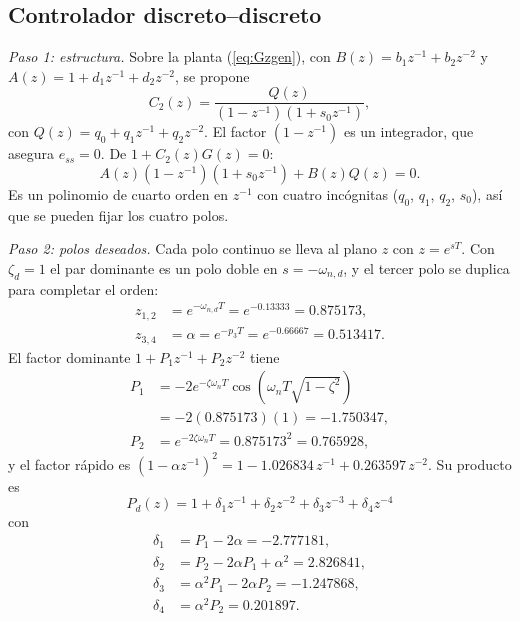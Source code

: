 \documentclass[conference]{IEEEtran}
\begin{document}
\subsection{Controlador discreto--discreto}
\textit{Paso 1: estructura.} Sobre la planta (\ref{eq:Gzgen}), con
$B(z) = b_1z^{-1} + b_2z^{-2}$ y $A(z) = 1 + d_1z^{-1} + d_2z^{-2}$, se
propone
\begin{equation}
  C_2(z) = \frac{Q(z)}{(1-z^{-1})(1+s_0z^{-1})},
  \label{eq:C2}
\end{equation}
con $Q(z) = q_0 + q_1z^{-1} + q_2z^{-2}$. El factor $(1-z^{-1})$ es un
integrador, que asegura $e_{ss} = 0$. De $1 + C_2(z)G(z) = 0$:
\begin{equation}
  A(z)(1-z^{-1})(1+s_0z^{-1}) + B(z)Q(z) = 0.
  \label{eq:carZ}
\end{equation}
Es un polinomio de cuarto orden en $z^{-1}$ con cuatro incógnitas
($q_0$, $q_1$, $q_2$, $s_0$), así que se pueden fijar los cuatro polos.

\textit{Paso 2: polos deseados.} Cada polo continuo se lleva al plano $z$ con
$z = e^{sT}$. Con $\zeta_d = 1$ el par dominante es un polo doble en
$s = -\omega_{n,d}$, y el tercer polo se duplica para completar el orden:
\begin{align*}
  z_{1,2} &= e^{-\omega_{n,d}T} = e^{-0.13333} = 0.875173,\\
  z_{3,4} &= \alpha = e^{-p_3T} = e^{-0.66667} = 0.513417.
\end{align*}
El factor dominante $1 + P_1z^{-1} + P_2z^{-2}$ tiene
\begin{align*}
  P_1 &= -2e^{-\zeta\omega_nT}\cos\!\left(\omega_nT\sqrt{1-\zeta^2}\right)\\
      &= -2(0.875173)(1) = -1.750347,\\[2pt]
  P_2 &= e^{-2\zeta\omega_nT} = 0.875173^2 = 0.765928,
\end{align*}
y el factor rápido es
$(1-\alpha z^{-1})^2 = 1 - 1.026834\,z^{-1} + 0.263597\,z^{-2}$. Su producto es
\begin{equation}
  P_d(z) = 1 + \delta_1z^{-1} + \delta_2z^{-2} + \delta_3z^{-3} + \delta_4z^{-4}
  \label{eq:Pdz}
\end{equation}
con
\begin{align*}
  \delta_1 &= P_1 - 2\alpha = -2.777181,\\
  \delta_2 &= P_2 - 2\alpha P_1 + \alpha^2 = 2.826841,\\
  \delta_3 &= \alpha^2P_1 - 2\alpha P_2 = -1.247868,\\
  \delta_4 &= \alpha^2P_2 = 0.201897.
\end{align*}
\end{document}
